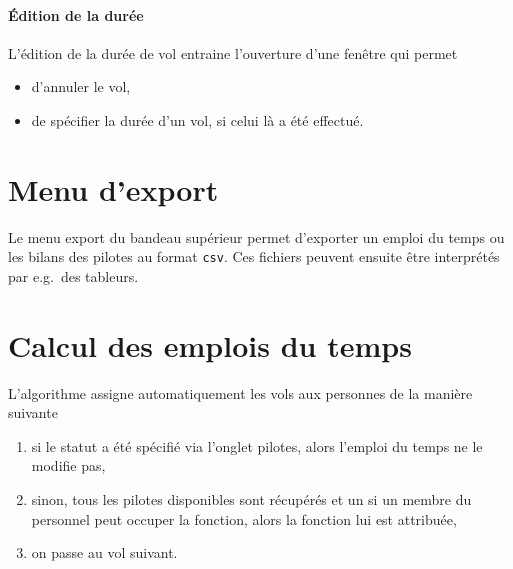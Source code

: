 \documentclass{scrartcl}
\begin{document}
\paragraph{Édition de la durée}
L'édition de la durée de vol entraine l'ouverture d'une fenêtre qui permet
\begin{itemize}
  \item d'annuler le vol,
  \item de spécifier la durée d'un vol, si celui là a été effectué.
\end{itemize}

\section{Menu d'export}
Le menu export du bandeau supérieur permet d'exporter un emploi du temps ou les
bilans des pilotes au
format \texttt{csv}. Ces fichiers peuvent ensuite être interprétés par e.g.\ des
tableurs.

\section{Calcul des emplois du temps}
L'algorithme assigne automatiquement les vols aux personnes de la manière
suivante
\begin{enumerate}
  \item si le statut  a été spécifié via l'onglet pilotes, alors l'emploi du
    temps ne le modifie pas,
  \item sinon, tous les pilotes disponibles sont récupérés et un si un membre du
    personnel peut occuper la fonction, alors la fonction lui est attribuée,
  \item on passe au vol suivant.
\end{enumerate}
\end{document}
